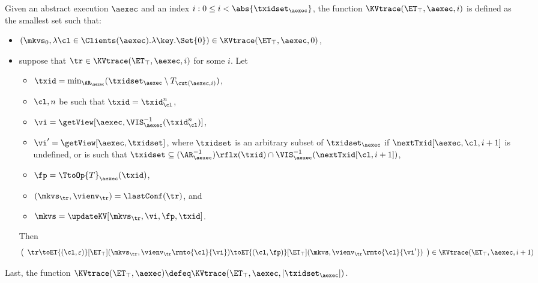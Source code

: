 \begin{definition}
\label{def:aexec2kvtrace}
Given an abstract execution $\aexec$ and an index $i : 0 \leq i < \abs{\txidset_\aexec}$, 
the function $\KVtrace(\ET_{\top}, \aexec, i)$ is defined as the smallest set such that:
\begin{itemize}
\item 
$(\mkvs_{0}, \lambda \cl \in \Clients(\aexec). \lambda \key.\Set{0}) \in \KVtrace(\ET_{\top}, \aexec, 0)$, 
\item suppose that $\tr \in \KVtrace(\ET_{\top}, \aexec, i)$ for some $i$.  
Let
\begin{itemize} 
\item $\txid = \min_{\AR_{\aexec}}(\txidset_{\aexec} \setminus T_{\cut(\aexec, i)})$, 
\item  $\cl, n$ be such that $\txid = \txid_{\cl}^{n}$, 
\item  $\vi = \getView[\aexec, \VIS^{-1}_{\aexec}(\txid_{\cl}^{n})]$, 
\item $\vi' = \getView[\aexec, \txidset]$, where $\txidset$ is an arbitrary subset of $\txidset_{\aexec}$ if 
$\nextTxid[\aexec, \cl, i+1]$ is undefined, or is such that 
$\txidset \subseteq (\AR_{\aexec}^{-1})\rflx(\txid) \cap \VIS^{-1}_{\aexec}(\nextTxid[\cl, i+1])$, 
\item $\fp = \TtoOp{T}_{\aexec}(\txid)$, 
\item $(\mkvs_{\tr}, \vienv_{\tr}) = \lastConf(\tr)$, and
\item $\mkvs = \updateKV[\mkvs_{\tr}, \vi, \fp, \txid]$.
\end{itemize}
Then
\[
\left( 
\begin{array}{l}
\tr \toET{(\cl, \varepsilon)}[\ET_{\top}] (\mkvs_{\tr}, \vienv_{\tr}\rmto{\cl}{\vi}) 
\toET{(\cl, \fp)}[\ET_{\top}] (\mkvs, \vienv_{\tr}\rmto{\cl}{\vi'}) 
\end{array}
\right) \in \KVtrace(\ET_{\top}, \aexec, i+1)
\]
\end{itemize}
Last, the function $\KVtrace(\ET_{\top}, \aexec) \defeq \KVtrace(\ET_{\top}, \aexec, \lvert \txidset_\aexec \rvert)$.
\end{definition}

